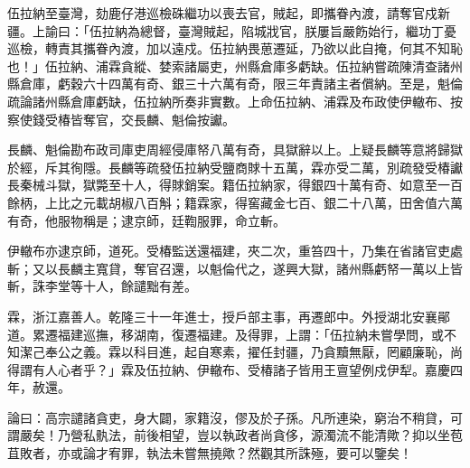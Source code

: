 \begin{pinyinscope}
伍拉納至臺灣，劾鹿仔港巡檢硃繼功以喪去官，賊起，即攜眷內渡，請奪官戍新疆。上諭曰：「伍拉納為總督，臺灣賊起，陷城戕官，朕屢旨嚴飭始行，繼功丁憂巡檢，轉責其攜眷內渡，加以遠戍。伍拉納畏葸遷延，乃欲以此自掩，何其不知恥也！」伍拉納、浦霖貪縱、婪索諸屬吏，州縣倉庫多虧缺。伍拉納嘗疏陳清查諸州縣倉庫，虧穀六十四萬有奇、銀三十六萬有奇，限三年責諸主者償納。至是，魁倫疏論諸州縣倉庫虧缺，伍拉納所奏非實數。上命伍拉納、浦霖及布政使伊轍布、按察使錢受椿皆奪官，交長麟、魁倫按讞。

長麟、魁倫勘布政司庫吏周經侵庫帑八萬有奇，具獄辭以上。上疑長麟等意將歸獄於經，斥其徇隱。長麟等疏發伍拉納受鹽商賕十五萬，霖亦受二萬，別疏發受椿讞長秦械斗獄，獄斃至十人，得賕銷案。籍伍拉納家，得銀四十萬有奇、如意至一百餘柄，上比之元載胡椒八百斛；籍霖家，得窖藏金七百、銀二十八萬，田舍值六萬有奇，他服物稱是；逮京師，廷鞫服罪，命立斬。

伊轍布亦逮京師，道死。受椿監送還福建，夾二次，重笞四十，乃集在省諸官吏處斬；又以長麟主寬貸，奪官召還，以魁倫代之，遂興大獄，諸州縣虧帑一萬以上皆斬，誅李堂等十人，餘譴黜有差。

霖，浙江嘉善人。乾隆三十一年進士，授戶部主事，再遷郎中。外授湖北安襄鄖道。累遷福建巡撫，移湖南，復遷福建。及得罪，上謂：「伍拉納未嘗學問，或不知潔己奉公之義。霖以科目進，起自寒素，擢任封疆，乃貪黷無厭，罔顧廉恥，尚得謂有人心者乎？」霖及伍拉納、伊轍布、受椿諸子皆用王亶望例戍伊犁。嘉慶四年，赦還。

論曰：高宗譴諸貪吏，身大闢，家籍沒，僇及於子孫。凡所連染，窮治不稍貸，可謂嚴矣！乃營私骫法，前後相望，豈以執政者尚貪侈，源濁流不能清歟？抑以坐苞苴敗者，亦或論才宥罪，執法未嘗無撓歟？然觀其所誅殛，要可以鑒矣！


\end{pinyinscope}